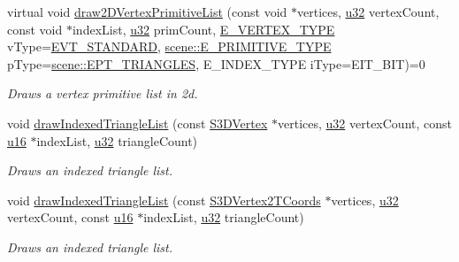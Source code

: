 \begin{DoxyCompactItemize}
virtual void \hyperlink{classirr_1_1video_1_1IVideoDriver_a34845920167c68578a78f842af54d140}{draw2\+D\+Vertex\+Primitive\+List} (const void $\ast$vertices, \hyperlink{namespaceirr_a0416a53257075833e7002efd0a18e804}{u32} vertex\+Count, const void $\ast$index\+List, \hyperlink{namespaceirr_a0416a53257075833e7002efd0a18e804}{u32} prim\+Count, \hyperlink{namespaceirr_1_1video_a0e3b59e025e0d0db0ed2ee0ce904deac}{E\+\_\+\+V\+E\+R\+T\+E\+X\+\_\+\+T\+Y\+PE} v\+Type=\hyperlink{namespaceirr_1_1video_a0e3b59e025e0d0db0ed2ee0ce904deaca98c8b791280bbf9252c4f4a37e91a416}{E\+V\+T\+\_\+\+S\+T\+A\+N\+D\+A\+RD}, \hyperlink{namespaceirr_1_1scene_a5d7de82f2169761194b2f44d95cdc1dc}{scene\+::\+E\+\_\+\+P\+R\+I\+M\+I\+T\+I\+V\+E\+\_\+\+T\+Y\+PE} p\+Type=\hyperlink{namespaceirr_1_1scene_a5d7de82f2169761194b2f44d95cdc1dca237fc76e4b259febd27b4b84066ca581}{scene\+::\+E\+P\+T\+\_\+\+T\+R\+I\+A\+N\+G\+L\+ES}, E\+\_\+\+I\+N\+D\+E\+X\+\_\+\+T\+Y\+PE i\+Type=E\+I\+T\+\_\+B\+IT)=0
\begin{DoxyCompactList}\small\item\em Draws a vertex primitive list in 2d. \end{DoxyCompactList}\item 
void \hyperlink{classirr_1_1video_1_1IVideoDriver_a55eba6140492faaed9dca7e16ad8dde2}{draw\+Indexed\+Triangle\+List} (const \hyperlink{structirr_1_1video_1_1S3DVertex}{S3\+D\+Vertex} $\ast$vertices, \hyperlink{namespaceirr_a0416a53257075833e7002efd0a18e804}{u32} vertex\+Count, const \hyperlink{namespaceirr_ae9f8ec82692ad3b83c21f555bfa70bcc}{u16} $\ast$index\+List, \hyperlink{namespaceirr_a0416a53257075833e7002efd0a18e804}{u32} triangle\+Count)
\begin{DoxyCompactList}\small\item\em Draws an indexed triangle list. \end{DoxyCompactList}\item 
void \hyperlink{classirr_1_1video_1_1IVideoDriver_a041d8028bc10f33c6707a3d1ddbdea4d}{draw\+Indexed\+Triangle\+List} (const \hyperlink{structirr_1_1video_1_1S3DVertex2TCoords}{S3\+D\+Vertex2\+T\+Coords} $\ast$vertices, \hyperlink{namespaceirr_a0416a53257075833e7002efd0a18e804}{u32} vertex\+Count, const \hyperlink{namespaceirr_ae9f8ec82692ad3b83c21f555bfa70bcc}{u16} $\ast$index\+List, \hyperlink{namespaceirr_a0416a53257075833e7002efd0a18e804}{u32} triangle\+Count)
\begin{DoxyCompactList}\small\item\em Draws an indexed triangle list. \end{DoxyCompactList}\item 

\end{DoxyCompactItemize}
